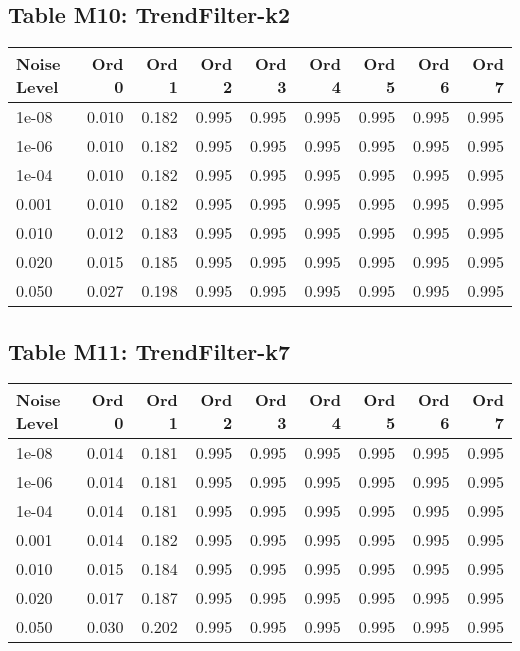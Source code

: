 \clearpage

\subsection*{Table M10: TrendFilter-k2}

\begin{longtable}{lrrrrrrrr}
\toprule
\textbf{Noise Level} & \textbf{Ord 0} & \textbf{Ord 1} & \textbf{Ord 2} & \textbf{Ord 3} & \textbf{Ord 4} & \textbf{Ord 5} & \textbf{Ord 6} & \textbf{Ord 7} \\
\midrule
\endhead
1e-08 & 0.010 & 0.182 & 0.995 & 0.995 & 0.995 & 0.995 & 0.995 & 0.995 \\
1e-06 & 0.010 & 0.182 & 0.995 & 0.995 & 0.995 & 0.995 & 0.995 & 0.995 \\
1e-04 & 0.010 & 0.182 & 0.995 & 0.995 & 0.995 & 0.995 & 0.995 & 0.995 \\
0.001 & 0.010 & 0.182 & 0.995 & 0.995 & 0.995 & 0.995 & 0.995 & 0.995 \\
0.010 & 0.012 & 0.183 & 0.995 & 0.995 & 0.995 & 0.995 & 0.995 & 0.995 \\
0.020 & 0.015 & 0.185 & 0.995 & 0.995 & 0.995 & 0.995 & 0.995 & 0.995 \\
0.050 & 0.027 & 0.198 & 0.995 & 0.995 & 0.995 & 0.995 & 0.995 & 0.995 \\
\bottomrule
\end{longtable}

\clearpage

\subsection*{Table M11: TrendFilter-k7}

\begin{longtable}{lrrrrrrrr}
\toprule
\textbf{Noise Level} & \textbf{Ord 0} & \textbf{Ord 1} & \textbf{Ord 2} & \textbf{Ord 3} & \textbf{Ord 4} & \textbf{Ord 5} & \textbf{Ord 6} & \textbf{Ord 7} \\
\midrule
\endhead
1e-08 & 0.014 & 0.181 & 0.995 & 0.995 & 0.995 & 0.995 & 0.995 & 0.995 \\
1e-06 & 0.014 & 0.181 & 0.995 & 0.995 & 0.995 & 0.995 & 0.995 & 0.995 \\
1e-04 & 0.014 & 0.181 & 0.995 & 0.995 & 0.995 & 0.995 & 0.995 & 0.995 \\
0.001 & 0.014 & 0.182 & 0.995 & 0.995 & 0.995 & 0.995 & 0.995 & 0.995 \\
0.010 & 0.015 & 0.184 & 0.995 & 0.995 & 0.995 & 0.995 & 0.995 & 0.995 \\
0.020 & 0.017 & 0.187 & 0.995 & 0.995 & 0.995 & 0.995 & 0.995 & 0.995 \\
0.050 & 0.030 & 0.202 & 0.995 & 0.995 & 0.995 & 0.995 & 0.995 & 0.995 \\
\bottomrule
\end{longtable}

